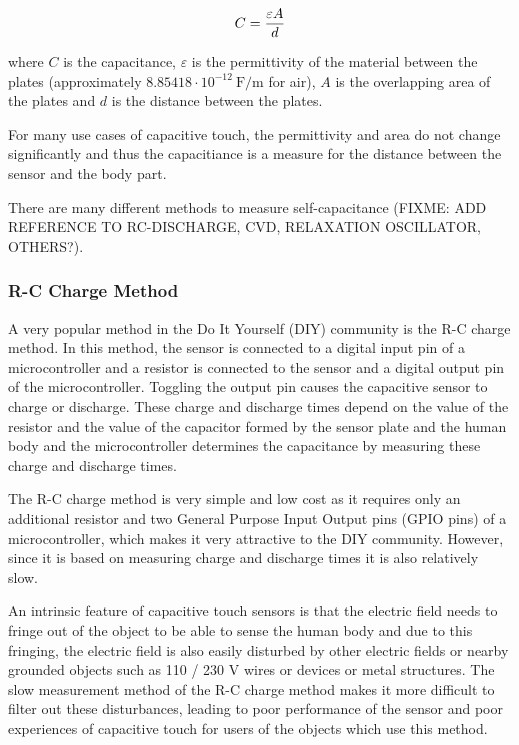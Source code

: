 \documentclass{sigchi-ext}
\begin{document}
\begin{equation}
C = {{\varepsilon A} \over {d}}
\end{equation}

where $C$ is the capacitance, $\varepsilon$ is the permittivity of the material
between the plates (approximately $8.85418 \cdot 10^{-12} ~ \textrm{F/m}$ for
air), $A$ is the overlapping area of the plates and $d$ is the distance between
the plates.

For many use cases of capacitive touch, the permittivity and area do not change
significantly and thus the capacitiance is a measure for the distance between
the sensor and the body part.

There are many different methods to measure
self-capacitance (FIXME: ADD REFERENCE TO RC-DISCHARGE, CVD, RELAXATION
OSCILLATOR, OTHERS?). 

\subsubsection{R-C Charge Method}
A very popular method in the Do It Yourself (DIY) community is the R-C charge
method. In this method, the sensor is connected to a digital input pin of a
microcontroller and a resistor is connected to the sensor and a digital output
pin of the microcontroller. Toggling the output pin causes the capacitive sensor
to charge or discharge. These charge and discharge times depend on the value of
the resistor and the value of the capacitor formed by the sensor plate and the
human body and the microcontroller determines the capacitance by measuring these
charge and discharge times.

The R-C charge method is very simple and low cost as it requires only an
additional resistor and two General Purpose Input Output pins (GPIO pins) of a
microcontroller, which makes it very attractive to the DIY community.  However,
since it is based on measuring charge and discharge times it is also relatively
slow.

An intrinsic feature of capacitive touch sensors is that the
electric field needs to fringe out of the object to be able to sense the human
body and due to this fringing, the electric field is also easily disturbed by
other electric fields or nearby grounded objects such as 110 / 230 V wires or
devices or metal structures. The slow measurement method of the R-C charge
method makes it more difficult to filter out these disturbances, leading to poor
performance of the sensor and poor experiences of capacitive touch for users of
the objects which use this method.
\end{document}

